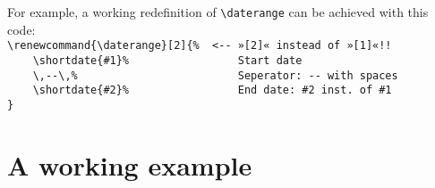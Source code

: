 \documentclass[11pt]{ltxdoc}
\begin{document}
	For example, a working redefinition of \verb|\daterange| can be achieved with this code: \\
	\verb|\renewcommand{\daterange}[2]{%  <-- »[2]« instead of »[1]«!!| \\\nopagebreak[4]
	\verb|    \shortdate{#1}%                 Start date| \\\nopagebreak[4]
	\verb|    \,--\,%                         Seperator: -- with spaces| \\\nopagebreak[4]
	\verb|    \shortdate{#2}%                 End date: #2 inst. of #1| \\\nopagebreak[4]
	\verb|}|


	\section{A working example}
	
	
\end{document}
